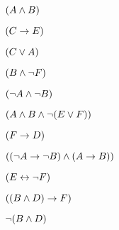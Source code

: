 \documentclass[PHIL101-Textbook.tex]{subfiles}
\begin{document}
\begin{earg}
\item $(A \land B)$ %
\item $(C \rightarrow E)$ %
\item $(C \vee A)$ %
\item $(B \land \neg F)$ %
\item $(\neg A \land \neg B)$ %
\item $(A \land B \land \neg(E \vee F))$ %
\item $(F \rightarrow D)$ %
\item $((\neg A \rightarrow \neg B) \land (A \rightarrow B))$ %
\item $(E \leftrightarrow \neg F)$ %
\item $((B \land D) \rightarrow F)$ %
\item $\neg(B \land D)$ %
\end{earg}
\end{document}

